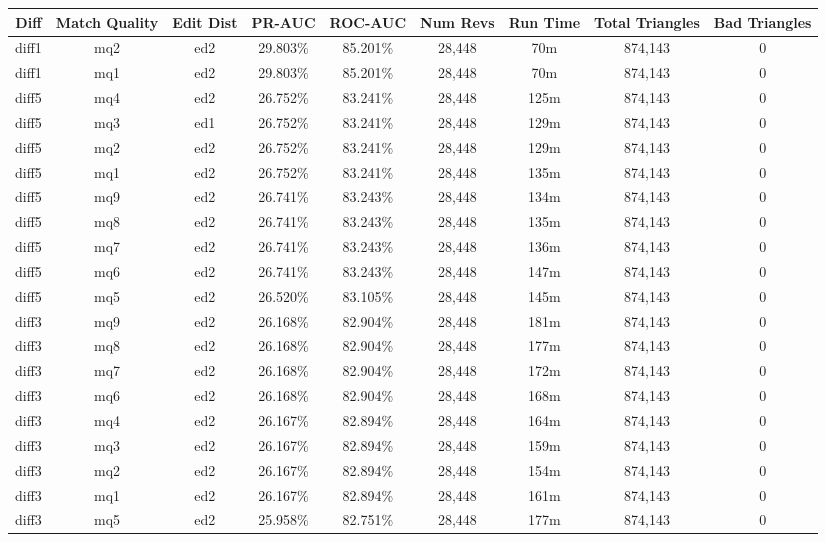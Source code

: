 \begin{sidewaystable}[!ph]
  \begin{center}
    \begin{tabular}{|c|c|c||c|c||c|c|c|c|}
\hline
Diff & Match Quality & Edit Dist
        & PR-AUC & ROC-AUC
        & Num Revs & Run Time
        & Total Triangles & Bad Triangles \\
\hline
\hline
diff1 & mq2 & ed2 & 29.803\% & 85.201\% & 28,448 & 70m & 874,143 & 0 \\
diff1 & mq1 & ed2 & 29.803\% & 85.201\% & 28,448 & 70m & 874,143 & 0 \\
diff5 & mq4 & ed2 & 26.752\% & 83.241\% & 28,448 & 125m & 874,143 & 0 \\
diff5 & mq3 & ed1 & 26.752\% & 83.241\% & 28,448 & 129m & 874,143 & 0 \\
diff5 & mq2 & ed2 & 26.752\% & 83.241\% & 28,448 & 129m & 874,143 & 0 \\
diff5 & mq1 & ed2 & 26.752\% & 83.241\% & 28,448 & 135m & 874,143 & 0 \\
diff5 & mq9 & ed2 & 26.741\% & 83.243\% & 28,448 & 134m & 874,143 & 0 \\
diff5 & mq8 & ed2 & 26.741\% & 83.243\% & 28,448 & 135m & 874,143 & 0 \\
diff5 & mq7 & ed2 & 26.741\% & 83.243\% & 28,448 & 136m & 874,143 & 0 \\
diff5 & mq6 & ed2 & 26.741\% & 83.243\% & 28,448 & 147m & 874,143 & 0 \\
diff5 & mq5 & ed2 & 26.520\% & 83.105\% & 28,448 & 145m & 874,143 & 0 \\
diff3 & mq9 & ed2 & 26.168\% & 82.904\% & 28,448 & 181m & 874,143 & 0 \\
diff3 & mq8 & ed2 & 26.168\% & 82.904\% & 28,448 & 177m & 874,143 & 0 \\
diff3 & mq7 & ed2 & 26.168\% & 82.904\% & 28,448 & 172m & 874,143 & 0 \\
diff3 & mq6 & ed2 & 26.168\% & 82.904\% & 28,448 & 168m & 874,143 & 0 \\
diff3 & mq4 & ed2 & 26.167\% & 82.894\% & 28,448 & 164m & 874,143 & 0 \\
diff3 & mq3 & ed2 & 26.167\% & 82.894\% & 28,448 & 159m & 874,143 & 0 \\
diff3 & mq2 & ed2 & 26.167\% & 82.894\% & 28,448 & 154m & 874,143 & 0 \\
diff3 & mq1 & ed2 & 26.167\% & 82.894\% & 28,448 & 161m & 874,143 & 0 \\
diff3 & mq5 & ed2 & 25.958\% & 82.751\% & 28,448 & 177m & 874,143 & 0 \\

\end{tabular}
\end{center}
\end{sidewaystable}
